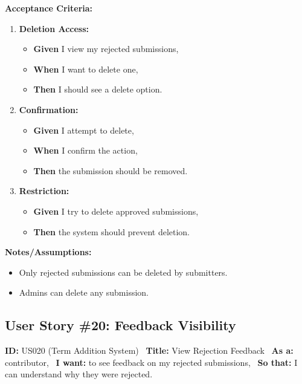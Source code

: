 \documentclass[12pt]{article}
\begin{document}
\vspace{1em}
\textbf{Acceptance Criteria:}
\begin{enumerate}
\item \textbf{Deletion Access:}
\begin{itemize}
\item \textbf{Given} I view my rejected submissions,
\item \textbf{When} I want to delete one,
\item \textbf{Then} I should see a delete option.
\end{itemize}

\item \textbf{Confirmation:}
\begin{itemize}
    \item \textbf{Given} I attempt to delete,
    \item \textbf{When} I confirm the action,
    \item \textbf{Then} the submission should be removed.
\end{itemize}

\item \textbf{Restriction:}
\begin{itemize}
    \item \textbf{Given} I try to delete approved submissions,
    \item \textbf{Then} the system should prevent deletion.
\end{itemize}
\end{enumerate}

\vspace{1em}
\textbf{Notes/Assumptions:}
\begin{itemize}
\item Only rejected submissions can be deleted by submitters.
\item Admins can delete any submission.
\end{itemize}

\subsection{User Story \#20: Feedback Visibility}
\textbf{ID:} US020 (Term Addition System) \
\textbf{Title:} View Rejection Feedback \
\textbf{As a:} contributor, \
\textbf{I want:} to see feedback on my rejected submissions, \
\textbf{So that:} I can understand why they were rejected.
\end{document}
